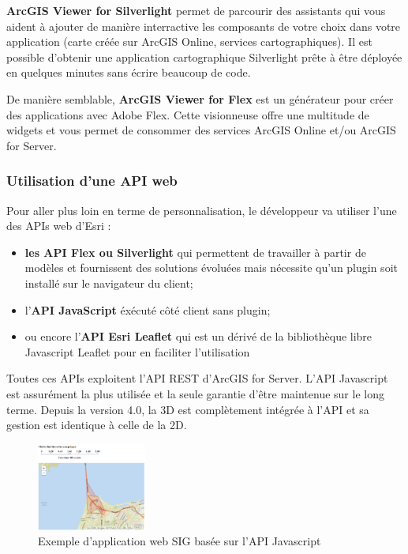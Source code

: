 \documentclass[11pt]{article}
\begin{document}
\textbf{ArcGIS Viewer for Silverlight} permet de parcourir des assistants qui vous aident à ajouter de manière interractive les composants de votre choix dans votre application (carte créée sur ArcGIS Online, services cartographiques). Il est possible d'obtenir une application cartographique Silverlight prête à être déployée en quelques minutes sans écrire beaucoup de code.

De manière semblable, \textbf{ArcGIS Viewer for Flex} est un générateur pour créer des applications avec Adobe Flex. Cette visionneuse offre une multitude de widgets et vous permet de consommer des services ArcGIS Online et/ou ArcGIS for Server.


\subsubsection{Utilisation d'une API web}
Pour aller plus loin en terme de personnalisation, le développeur va utiliser l'une des APIs web d'Esri : 
\begin{itemize}
	\item \textbf{les API Flex ou Silverlight} qui permettent de travailler à partir de modèles et fournissent des solutions évoluées mais nécessite qu'un plugin soit installé sur le navigateur du client;
	\item l'\textbf{API JavaScript} éxécuté côté client sans plugin;
	\item ou encore l'\textbf{API Esri Leaflet} qui est un dérivé de la bibliothèque libre Javascript Leaflet pour en faciliter l'utilisation
\end{itemize}

Toutes ces APIs exploitent l'API REST d'ArcGIS for Server. L'API Javascript est assurément la plus utilisée et la seule garantie d'être maintenue sur le long terme. Depuis la version 4.0, la 3D est complètement intégrée à l'API et sa gestion est identique à celle de la 2D.

\begin{figure}[H]
	\center \includegraphics[width=0.32\textwidth]{img/cours/api_javascript.png}
	\caption{Exemple d'application web SIG basée sur l'API Javascript}
\end{figure}
\end{document}
